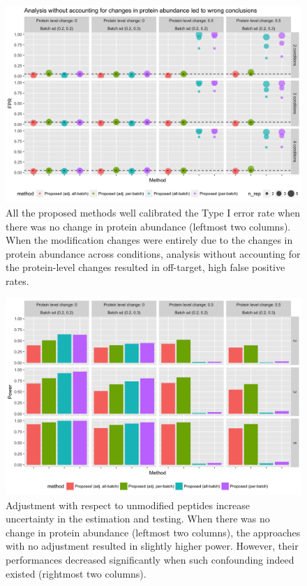 \documentclass{mcp}
\begin{document}
\begin{figure}[h!]
\centering
\includegraphics[width=.85\textwidth]{sim/prot_fpr}
\caption{
All the proposed methods well calibrated the Type I error rate when there was no change in protein abundance (leftmost two columns). When the modification changes were entirely due to the changes in protein abundance across conditions, analysis without accounting for the protein-level changes resulted in off-target, high false positive rates. \label{fig:prot_fpr}}
\end{figure}


\begin{figure}[h!]
\centering
\includegraphics[width=.85\textwidth]{sim/prot_pwr}
\caption{Adjustment with respect to unmodified peptides increase uncertainty in the estimation and testing. When there was no change in protein abundance (leftmost two columns), the approaches with no adjustment resulted in slightly higher power. However, their performances decreased significantly when such confounding indeed existed (rightmost two columns). \label{fig:prot_pwr}}
\end{figure}
\end{document}
